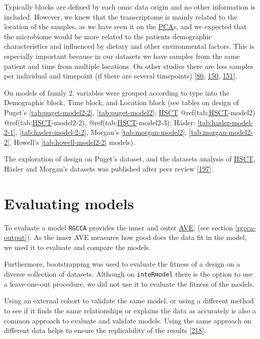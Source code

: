 \documentclass[
  12pt,
  a4paper,
  twoside,
  openright]{book}
\begin{document}
Typically blocks are defined by each omic data origin and no other information is included.
However, we knew that the transcriptome is mainly related to the location of the samples, as we have seen it on the \protect\hyperlink{acronyms_PCA}{PCA}s, and we expected that the microbiome would be more related to the patients demographic characteristics and influenced by dietary and other environmental factors.
This is especially important because in our datasets we have samples from the same patient and time from multiple locations.
On other studies there are less samples per individual and timepoint (if there are several timepoints) {[}\protect\hyperlink{ref-hasler_uncoupling_2016}{80}, \protect\hyperlink{ref-morgan2015}{150}, \protect\hyperlink{ref-howell2018}{151}{]}.

On models of family 2, variables were grouped according to type into the Demographic block, Time block, and Location block (see tables on design of Puget's \ref{tab:puget-model2-2}, \ref{tab:puget-model2}; \protect\hyperlink{acronyms_HSCT}{HSCT} @ref(tab:\protect\hyperlink{acronyms_HSCT}{HSCT}-model2) @ref(tab:\protect\hyperlink{acronyms_HSCT}{HSCT}-model2-2), @ref(tab:\protect\hyperlink{acronyms_HSCT}{HSCT}-model2-3); Häsler: \ref{tab:hasler-model-2-1}, \ref{tab:hasler-model-2-2}, Morgan's \ref{tab:morgan-model2}, \ref{tab:morgan-model2-2}, Howell's \ref{tab:howell-model2-2} models).

The exploration of design on Puget's dataset, and the datasets analysis of \protect\hyperlink{acronyms_HSCT}{HSCT}, Häsler and Morgan's datasets was published after peer review {[}\protect\hyperlink{ref-revilla2021}{197}{]}.

\hypertarget{evaluating-models}{%
\section{Evaluating models}\label{evaluating-models}}

To evaluate a model \texttt{RGCCA} provides the inner and outer \protect\hyperlink{acronyms_AVE}{AVE}; (see section \ref{rgcca-output}).
As the inner AVE measures how good does the data fit in the model, we used it to evaluate and compare the models.

Furthermore, bootstrapping was used to evaluate the fitness of a design on a diverse collection of datasets.
Although on \texttt{inteRmodel} there is the option to use a leave-one-out procedure, we did not use it to evaluate the fitness of the models.

Using an external cohort to validate the same model, or using a different method to see if it finds the same relationships or explains the data as accurately is also a common approach to evaluate and validate models.
Using the same approach on different data helps to ensure the replicability of the results {[}\protect\hyperlink{ref-community2021}{218}{]}.
\end{document}
